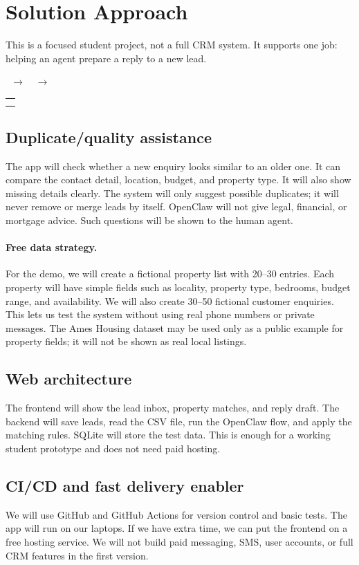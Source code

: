 \documentclass[10pt,a4paper]{article}
\newcommand{\branchdiagram}{\begin{center}\small\fbox{\strut New lead}\ $\rightarrow$\ \fbox{\strut Rules + OpenClaw}\ $\rightarrow$\ \begin{tabular}{c}\fbox{\strut Reply draft}\\[2pt]\fbox{\strut Human review}\end{tabular}\end{center}}
\begin{document}
\section{Solution Approach}
This is a focused student project, not a full CRM system. It supports one job: helping an agent prepare a reply to a new lead.
\branchdiagram

\subsection{Duplicate/quality assistance}
The app will check whether a new enquiry looks similar to an older one. It can compare the contact detail, location, budget, and property type. It will also show missing details clearly. The system will only suggest possible duplicates; it will never remove or merge leads by itself. OpenClaw will not give legal, financial, or mortgage advice. Such questions will be shown to the human agent.

\paragraph{Free data strategy.}
For the demo, we will create a fictional property list with 20--30 entries. Each property will have simple fields such as locality, property type, bedrooms, budget range, and availability. We will also create 30--50 fictional customer enquiries. This lets us test the system without using real phone numbers or private messages. The Ames Housing dataset may be used only as a public example for property fields; it will not be shown as real local listings.

\subsection{Web architecture}
The frontend will show the lead inbox, property matches, and reply draft. The backend will save leads, read the CSV file, run the OpenClaw flow, and apply the matching rules. SQLite will store the test data. This is enough for a working student prototype and does not need paid hosting.

\subsection{CI/CD and fast delivery enabler}
We will use GitHub and GitHub Actions for version control and basic tests. The app will run on our laptops. If we have extra time, we can put the frontend on a free hosting service. We will not build paid messaging, SMS, user accounts, or full CRM features in the first version.
\end{document}
